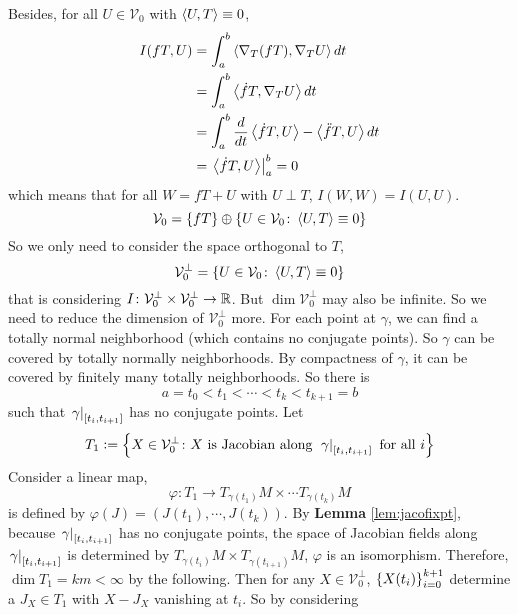 \begin{enumerate}[label=\arabic{*}.]
	Besides, for all $U \in \mathcal{V}_0$ with $\left\langle U,T \right\rangle \equiv 0$,
	\begin{equation*}
		\begin{aligned}
			I(fT,U) &= \int_a^b \left\langle \nabla_T(fT),\nabla_TU \right\rangle dt \\
			&= \int_a^b \left\langle \dot{f}T,\nabla_TU \right\rangle dt \\
			&= \int_a^b \frac{d}{dt}\left\langle \dot{f}T,U \right\rangle - \left\langle \ddot{f}T,U \right\rangle dt \\
			&= \left.\left\langle \dot{f}T,U \right\rangle\right\lvert_a^b = 0
		\end{aligned}
	\end{equation*}
	which means that for all $W = fT+U$ with $U \perp T$, $I(W,W) = I(U,U)$. 
	\begin{equation*}
		\mathcal{V}_0 = \left\{fT\right\} \oplus \left\{U \in \mathcal{V}_0 \colon \left\langle U,T \right\rangle \equiv 0\right\}
	\end{equation*}
	So we only need to consider the space orthogonal to $T$,
	\begin{equation*}
		\mathcal{V}_0^\perp = \left\{U \in \mathcal{V}_0 \colon \left\langle U,T \right\rangle \equiv 0\right\}
	\end{equation*}
	that is considering $I \colon \mathcal{V}_0^\perp \times \mathcal{V}_0^\perp \rightarrow \mathbb{R}$. But $\dim \mathcal{V}_0^\perp$ may also be infinite. So we need to reduce the dimension of $\mathcal{V}_0^\perp$ more. For each point at $\gamma$, we can find a totally normal neighborhood (which contains no conjugate points). So $\gamma$ can be covered by totally normally neighborhoods. By compactness of $\gamma$, it can be covered by finitely many totally neighborhoods. So there is
	\begin{equation*}
		a=t_0 < t_1 < \cdots < t_k < t_{k+1} = b
	\end{equation*}
	such that $\left.\gamma\right\lvert_{[t_i,t_{i+1}]}$ has no conjugate points. Let
	\begin{equation*}
		T_1 \vcentcolon= \left\{X \in \mathcal{V}_0^\perp \colon X \text{ is Jacobian along } \left.\gamma\right\lvert_{[t_i,t_{i+1}]} \text{ for all }i\right\}
	\end{equation*}
	Consider a linear map,
	\begin{equation*}
		\varphi \colon T_1 \longrightarrow T_{\gamma(t_1)}M \times \cdots T_{\gamma(t_k)}M
	\end{equation*}
	is defined by $\varphi(J) = (J(t_1),\cdots,J(t_k))$. By \textbf{Lemma} \ref{lem:jacofixpt}, because $\left.\gamma\right\lvert_{[t_i,t_{i+1}]}$ has no conjugate points, the space of Jacobian fields along $\left.\gamma\right\lvert_{[t_i,t_{i+1}]}$ is determined by $T_{\gamma(t_i)}M \times T_{\gamma(t_{i+1})}M$, $\varphi$ is an isomorphism. Therefore, $\dim T_1 = km < \infty$ by the following. Then for any $X \in \mathcal{V}_0^\perp$, $\left\{X(t_i)\right\}_{i=0}^{k+1}$ determine a $J_X \in T_1$ with $X - J_X$ vanishing at $t_i$. So by considering

\end{enumerate}
